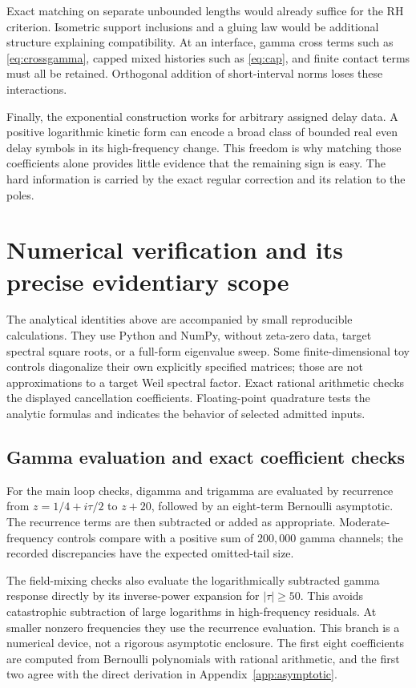 \documentclass[11pt]{article}
\numberwithin{equation}{section}
\theoremstyle{definition}
\theoremstyle{remark}
\begin{document}
Exact matching on separate unbounded lengths would already suffice for the RH criterion. Isometric support inclusions and a gluing law would be additional structure explaining compatibility. At an interface, gamma cross terms such as \eqref{eq:crossgamma}, capped mixed histories such as \eqref{eq:cap}, and finite contact terms must all be retained. Orthogonal addition of short-interval norms loses these interactions.

Finally, the exponential construction works for arbitrary assigned delay data. A positive logarithmic kinetic form can encode a broad class of bounded real even delay symbols in its high-frequency change. This freedom is why matching those coefficients alone provides little evidence that the remaining sign is easy. The hard information is carried by the exact regular correction and its relation to the poles.

\section{Numerical verification and its precise evidentiary scope}
\label{sec:numerics}
The analytical identities above are accompanied by small reproducible calculations. They use Python and NumPy, without zeta-zero data, target spectral square roots, or a full-form eigenvalue sweep. Some finite-dimensional toy controls diagonalize their own explicitly specified matrices; those are not approximations to a target Weil spectral factor. Exact rational arithmetic checks the displayed cancellation coefficients. Floating-point quadrature tests the analytic formulas and indicates the behavior of selected admitted inputs.

\subsection{Gamma evaluation and exact coefficient checks}
For the main loop checks, digamma and trigamma are evaluated by recurrence from $z=1/4+i\tau/2$ to $z+20$, followed by an eight-term Bernoulli asymptotic. The recurrence terms are then subtracted or added as appropriate. Moderate-frequency controls compare with a positive sum of $200{,}000$ gamma channels; the recorded discrepancies have the expected omitted-tail size.

The field-mixing checks also evaluate the logarithmically subtracted gamma response directly by its inverse-power expansion for $|\tau|\ge50$. This avoids catastrophic subtraction of large logarithms in high-frequency residuals. At smaller nonzero frequencies they use the recurrence evaluation. This branch is a numerical device, not a rigorous asymptotic enclosure. The first eight coefficients are computed from Bernoulli polynomials with rational arithmetic, and the first two agree with the direct derivation in Appendix~\ref{app:asymptotic}.
\end{document}

